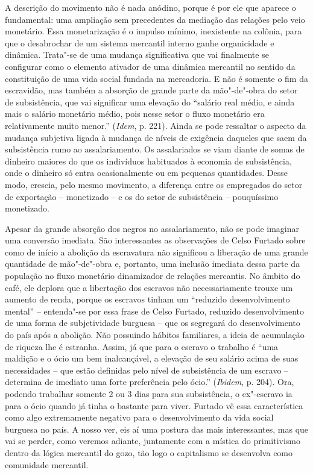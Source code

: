 {A descrição do movimento não é nada anódino, porque é por ele que
aparece o fundamental: uma ampliação sem precedentes da mediação das
relações pelo veio monetário. Essa monetarização é o impulso mínimo,
inexistente na colônia, para que o desabrochar de um sistema mercantil
interno ganhe organicidade e dinâmica. Trata"-se de uma mudança
significativa que vai finalmente se configurar como o elemento ativador
de uma dinâmica mercantil no sentido da constituição de uma vida social
fundada na mercadoria. E não é somente o fim da escravidão, mas também a
absorção de grande parte da mão"-de"-obra do setor de subsistência, que
vai significar uma elevação do ``salário real médio, e ainda mais o
salário monetário médio, pois nesse setor o fluxo monetário era
relativamente muito menor.'' (\emph{Idem}, p. 221). Ainda se pode
ressaltar o aspecto da mudança subjetiva ligada à mudança de níveis de
exigência daqueles que saem da subsistência rumo ao assalariamento. Os
assalariados se viam diante de somas de dinheiro maiores do que os
indivíduos habituados à economia de subsistência, onde o dinheiro só
entra ocasionalmente ou em pequenas quantidades. Desse modo, crescia,
pelo mesmo movimento, a diferença entre os empregados do setor de
exportação -- monetizado -- e os do setor de subsistência -- pouquíssimo
monetizado.

Apesar da grande absorção dos negros no assalariamento, não se pode
imaginar uma conversão imediata. São interessantes as
observações de Celso Furtado sobre como de início a abolição da
escravatura não significou a liberação de uma grande quantidade de
mão"-de"-obra e, portanto, uma inclusão imediata dessa parte da população
no fluxo monetário dinamizador de relações mercantis. No âmbito do café,
ele deplora que a libertação dos escravos não necessariamente trouxe um
aumento de renda, porque os escravos tinham um ``reduzido
desenvolvimento mental'' -- entenda"-se por essa frase de Celso Furtado,
reduzido desenvolvimento de uma forma de subjetividade burguesa -- que
os segregará do desenvolvimento do país após a abolição. Não possuindo
hábitos familiares, a ideia de acumulação de riqueza lhe é estranha.
Assim, já que para o escravo o trabalho é ``uma maldição e o ócio um bem
inalcançável, a elevação de seu salário acima de suas necessidades --
que estão definidas pelo nível de subsistência de um escravo --
determina de imediato uma forte preferência pelo ócio.'' (\emph{Ibidem},
p. 204). Ora, podendo trabalhar somente 2 ou 3 dias para sua
subsistência, o ex"-escravo ia para o ócio quando já tinha o bastante
para viver. Furtado vê essa característica como algo extremamente
negativo para o desenvolvimento da vida social burguesa no país. A nosso
ver, eis aí uma postura das mais interessantes, mas que vai se perder,
como veremos adiante, juntamente com a mística do primitivismo dentro da
lógica mercantil do gozo, tão logo o capitalismo se desenvolva como
comunidade mercantil.

}

